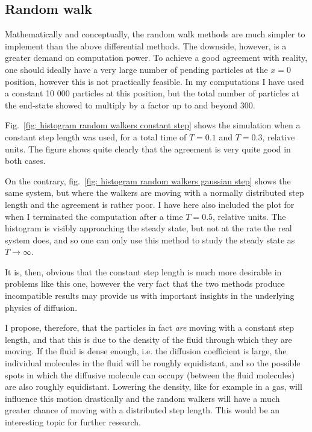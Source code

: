 \documentclass[twoside, 11pt]{article}
\begin{document}
	\subsection{Random walk}
		Mathematically and conceptually, the random walk methods are much simpler to implement than the above differential methods. The downside, however, is a greater demand on computation power. To achieve a good agreement with reality, one should ideally have a very large number of pending particles at the $x=0$ position, however this is not practically feasible. In my computations I have used a constant 10 000 particles at this position, but the total number of particles at the end-state showed to multiply by a factor up to and beyond 300.
		
		Fig.~\ref{fig: histogram random walkers constant step} shows the simulation when a constant step length was used, for a total time of $T=0.1$ and $T=0.3$, relative units. The figure shows quite clearly that the agreement is very quite good in both cases. 
		
		On the contrary, fig.~\ref{fig: histogram random walkers gaussian step} shows the same system, but where the walkers are moving with a normally distributed step length and the agreement is rather poor. I have here also included the plot for when I terminated the computation after a time $T=0.5$, relative units. The histogram is visibly approaching the steady state, but not at the rate the real system does, and so one can only use this method to study the steady state as $T\rightarrow \infty$.

		It is, then, obvious that the constant step length is much more desirable in problems like this one, however the very fact that the two methods produce incompatible results may provide us with important insights in the underlying physics of diffusion. 
		
		I propose, therefore, that the particles in fact \textit{are} moving with a constant step length, and that this is due to the density of the fluid through which they are moving. If the fluid is dense enough, i.e. the diffusion coefficient is large, the individual molecules in the fluid will be roughly equidistant, and so the possible spots in which the diffusive molecule can occupy (between the fluid molecules) are also roughly equidistant. Lowering the density, like for example in a gas, will influence this motion drastically and the random walkers will have a much greater chance of moving with a distributed step length. This would be an interesting topic for further research.
		
\end{document}
